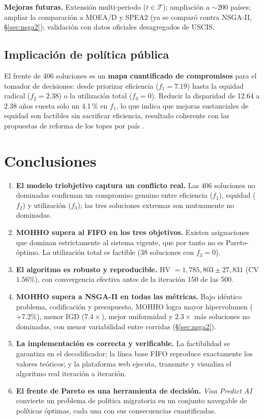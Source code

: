 \documentclass[11pt,letterpaper]{article}
\begin{document}
\begin{yellowbox}
\textbf{Mejoras futuras.} Extensión multi-periodo ($t\in\mathcal{T}$); ampliación a $\sim$200 países; ampliar la comparación a MOEA/D y SPEA2 (ya se comparó contra NSGA-II, §\ref{sec:nsga2}); validación con datos oficiales desagregados de USCIS.
\end{yellowbox}

\subsection{Implicación de política pública}
El frente de 406 soluciones es un \textbf{mapa cuantificado de compromisos} para el tomador de decisiones: desde priorizar eficiencia ($f_1=7.19$) hasta la equidad radical ($f_2=2.38$) o la utilización total ($f_3=0$). Reducir la disparidad de 12.64 a 2.38 años cuesta solo un 4.1\,\% en $f_1$, lo que indica que mejoras sustanciales de equidad son factibles sin sacrificar eficiencia, resultado coherente con las propuestas de reforma de los topes por país \parencite{fwd2024,crs2023}.

\section{Conclusiones}
\label{sec:conclusiones}

\begin{enumerate}\setlength{\itemsep}{2pt}
    \item \textbf{El modelo triobjetivo captura un conflicto real.} Las 406 soluciones no dominadas confirman un compromiso genuino entre eficiencia ($f_1$), equidad ($f_2$) y utilización ($f_3$); las tres soluciones extremas son mutuamente no dominadas.
    \item \textbf{MOHHO supera al FIFO en los tres objetivos.} Existen asignaciones que dominan estrictamente al sistema vigente, que por tanto no es Pareto-óptimo. La utilización total es factible (38 soluciones con $f_3=0$).
    \item \textbf{El algoritmo es robusto y reproducible.} HV $=1{,}785{,}803\pm27{,}831$ (CV $1.56\%$), con convergencia efectiva antes de la iteración 150 de las 500.
    \item \textbf{MOHHO supera a NSGA-II en todas las métricas.} Bajo idéntico problema, codificación y presupuesto, MOHHO logra mayor hipervolumen ($+7.2\%$), menor IGD ($7.4\times$), mejor uniformidad y $2.3\times$ más soluciones no dominadas, con menor variabilidad entre corridas (§\ref{sec:nsga2}).
    \item \textbf{La implementación es correcta y verificable.} La factibilidad se garantiza en el decodificador; la línea base FIFO reproduce exactamente los valores teóricos; y la plataforma web ejecuta, transmite y visualiza el algoritmo real iteración a iteración.
    \item \textbf{El frente de Pareto es una herramienta de decisión.} \textit{Visa Predict AI} convierte un problema de política migratoria en un conjunto navegable de políticas óptimas, cada una con sus consecuencias cuantificadas.
\end{enumerate}
\end{document}
